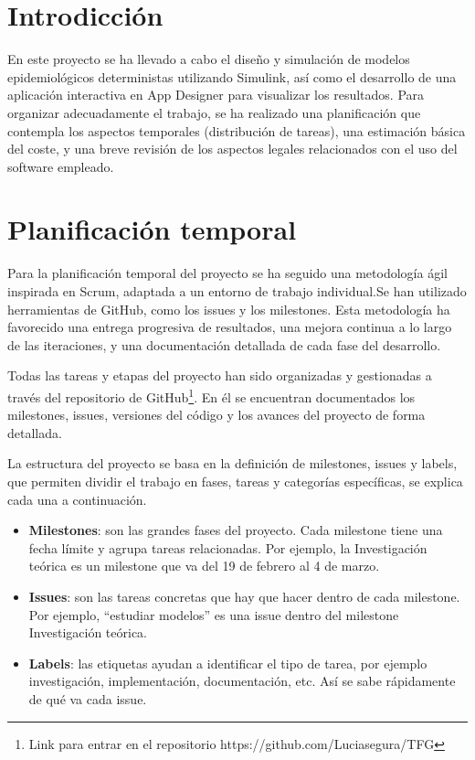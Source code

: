 
\section{Introdicción}
En este proyecto se ha llevado a cabo el diseño y simulación de modelos epidemiológicos deterministas utilizando Simulink, así como el desarrollo de una aplicación interactiva en App Designer para visualizar los resultados. Para organizar adecuadamente el trabajo, se ha realizado una planificación que contempla los aspectos temporales (distribución de tareas), una estimación básica del coste, y una breve revisión de los aspectos legales relacionados con el uso del software empleado.

\section{Planificación temporal}
Para la planificación temporal del proyecto se ha seguido una metodología ágil inspirada en Scrum, adaptada a un entorno de trabajo individual.Se han utilizado herramientas de GitHub, como los issues y los milestones. Esta metodología ha favorecido una entrega progresiva de resultados, una mejora continua a lo largo de las iteraciones, y una documentación detallada de cada fase del desarrollo.

Todas las tareas y etapas del proyecto han sido organizadas y gestionadas a través del repositorio de GitHub\footnote{Link para entrar en el repositorio https://github.com/Luciasegura/TFG}. En él se encuentran documentados los milestones, issues, versiones del código y los avances del proyecto de forma detallada.

La estructura del proyecto se basa en la definición de milestones, issues y labels, que permiten dividir el trabajo en fases, tareas y categorías específicas, se explica cada una a continuación.
\begin{itemize}
    \item \textbf{Milestones}: son las grandes fases del proyecto. Cada milestone tiene una fecha límite y agrupa tareas relacionadas. Por ejemplo, la Investigación teórica es un milestone que va del 19 de febrero al 4 de marzo.
    \item \textbf{Issues}: son las tareas concretas que hay que hacer dentro de cada milestone. Por ejemplo, “estudiar modelos” es una issue dentro del milestone Investigación teórica.
    \item \textbf{Labels}: las etiquetas ayudan a identificar el tipo de tarea, por ejemplo investigación, implementación, documentación, etc. Así se sabe rápidamente de qué va cada issue.
\end{itemize}

